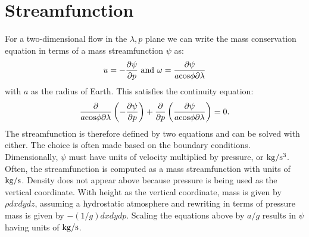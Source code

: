 \documentclass[11pt]{article}   	%
\begin{document}


\appendix


\section{Streamfunction}

For a two-dimensional flow in the $\lambda,p$ plane we can write the mass conservation equation in terms of a 
mass streamfunction $\psi$ as: 
\begin{equation}
u =  -\frac{\partial \psi}{\partial p}   \,\, {\rm and} \,\, \omega =\frac{\partial \psi}{a \rm{cos} \phi \partial \lambda}
\end{equation}
with $a$ as the radius of Earth.
This satisfies the continuity equation: 
\begin{equation}
\frac{\partial}{a \rm{cos} \phi\partial\lambda}\left(-\frac{\partial \psi}{\partial p}\right)+\frac{\partial}{\partial p}\left(\frac{\partial \psi}{a \rm{cos}\phi \partial \lambda}\right)=0.
\end{equation}
The streamfunction is therefore defined by two equations and can be solved with either.  The choice is often made based on the 
boundary conditions.  Dimensionally, $\psi$ must have units of velocity multiplied by pressure, or $\rm{kg/s^3}$.  Often, the streamfunction
is computed as a mass streamfunction with units of $\rm{kg/s}$.  Density does not appear above
because pressure is being used as the vertical coordinate.   With height as the vertical coordinate, mass is given by $\rho dxdydz$, 
assuming a hydrostatic atmosphere and rewriting in terms of pressure mass is given by $-(1/g) dxdydp$.
Scaling the equations above by $a/g$ results in $\psi$ having units of $\rm{kg/s}$.  
\end{document}

